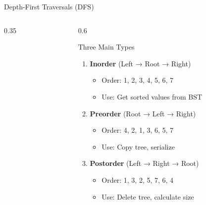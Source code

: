 \documentclass[aspectratio=169,xcolor=dvipsnames]{beamer}
\begin{document}
\begin{frame}{Depth-First Traversals (DFS)}
  \begin{columns}
    \begin{column}{0.35\textwidth}
    \end{column}
    \begin{column}{0.6\textwidth}
      \begin{block}{Three Main Types}
        \begin{enumerate}
          \item \textbf{Inorder} (Left → Root → Right)
            \begin{itemize}
              \item Order: 1, 2, 3, 4, 5, 6, 7
              \item Use: Get sorted values from BST
            \end{itemize}
          \item \textbf{Preorder} (Root → Left → Right)
            \begin{itemize}
              \item Order: 4, 2, 1, 3, 6, 5, 7
              \item Use: Copy tree, serialize
            \end{itemize}
          \item \textbf{Postorder} (Left → Right → Root)
            \begin{itemize}
              \item Order: 1, 3, 2, 5, 7, 6, 4
              \item Use: Delete tree, calculate size
            \end{itemize}
        \end{enumerate}
      \end{block}
    \end{column}
  \end{columns}
\end{frame}
\end{document}
